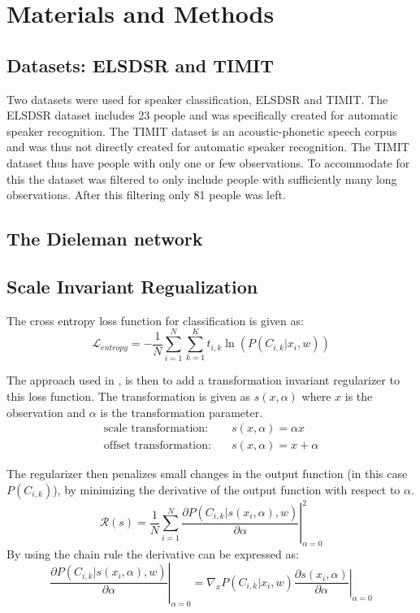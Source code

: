 \section{Materials and Methods}

\subsection{Datasets: ELSDSR and TIMIT}

Two datasets were used for speaker classification, ELSDSR and TIMIT. The ELSDSR dataset includes 23 people and was specifically created for automatic speaker recognition. The TIMIT dataset is an acoustic-phonetic speech corpus and was thus not directly created for automatic speaker recognition. The TIMIT dataset thus have people with only one or few observations. To accommodate for this the dataset was filtered to only include people with sufficiently many long observations. After this filtering only 81 people was left.

\subsection{The Dieleman network}


\subsection{Scale Invariant Regualization}

The cross entropy loss function for classification is given as:
\begin{equation}
\mathcal{L}_{entropy} = - \frac{1}{N} \sum_{i=1}^N \sum_{k=1}^K t_{i,k} \ln(P(C_{i,k} | x_i, w))
\end{equation}

The approach used in \cite{scale-invariante}, is then to add a transformation invariant regularizer to this loss function. The transformation is given as $s(x, \alpha)$ where $x$ is the observation and $\alpha$ is the transformation parameter.
\begin{align}
\text{scale transformation:}&\quad s(x, \alpha) = \alpha x\\
\text{offset transformation:}&\quad s(x, \alpha) = x + \alpha
\end{align}

The regularizer then penalizes small changes in the output function (in this case $P(C_{i, k})$), by minimizing the derivative of the output function with respect to $\alpha$.
\begin{equation}
\mathcal{R}(s) = \frac{1}{N} \sum_{i=1}^N \left. \frac{\partial P(C_{i, k} | s(x_i, \alpha), w)}{\partial \alpha} \right|^2_{\alpha=0}
\end{equation}
By using the chain rule the derivative can be expressed as:
\begin{equation*}
\left. \frac{\partial P(C_{i, k} | s(x_i, \alpha), w)}{\partial \alpha} \right|_{\alpha=0} = \left.\nabla_x P(C_{i, k} | x_i, w) \frac{\partial s(x_i, \alpha)}{\partial \alpha} \right|_{\alpha=0}
\end{equation*}

